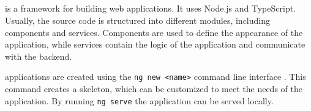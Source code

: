 \subsection{\angular{}}\label{sec:FE_angular}

\angular{} is a framework for building web applications.
It uses Node.js and TypeScript.
Usually, the source code is structured into different modules, including components and services.
Components are used to define the appearance of the application, while
services contain the logic of the application and communicate with the backend.

\angular{} applications are created using the \texttt{ng new <name>} command line interface \cite{angular_book2018}.
This command creates a skeleton, which can be customized to meet the needs of the application.
By running \texttt{ng serve} the application can be served locally.